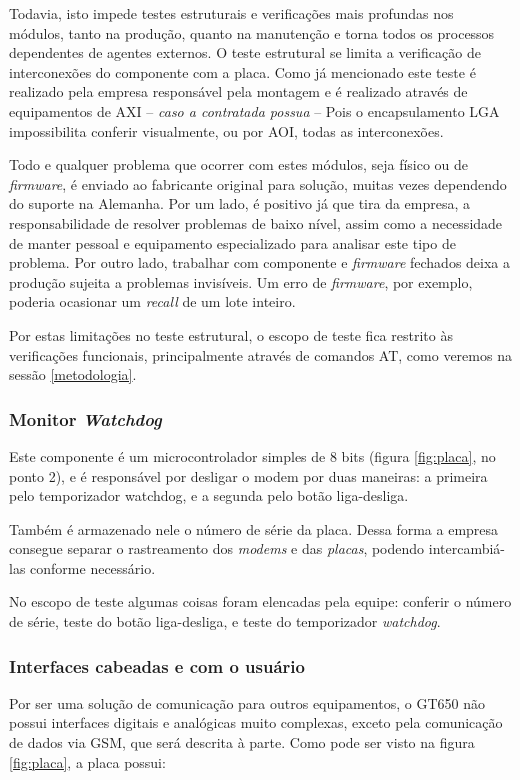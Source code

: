                 Todavia, isto impede testes estruturais e verificações mais profundas nos módulos, tanto na produção, quanto na manutenção e torna todos os processos dependentes de agentes externos. O teste estrutural se limita a verificação de interconexões do componente com a placa. Como já mencionado este teste é realizado pela empresa responsável pela montagem e é realizado através de equipamentos de AXI -- \textit{caso a contratada possua} -- Pois o encapsulamento LGA impossibilita conferir visualmente, ou por AOI, todas as interconexões. 
                
                Todo e qualquer problema que ocorrer com estes módulos, seja físico ou de \textit{firmware}, é enviado ao fabricante original para solução, muitas vezes dependendo do suporte na Alemanha. Por um lado, é positivo já que tira da empresa, a responsabilidade de resolver problemas de baixo nível, assim como a necessidade de manter pessoal e equipamento especializado para analisar este tipo de problema. Por outro lado, trabalhar com componente e \textit{firmware} fechados deixa a produção sujeita a problemas invisíveis. Um erro de \textit{firmware}, por exemplo, poderia ocasionar um \textit{recall} de um lote inteiro.
                
                Por estas limitações no teste estrutural, o escopo de teste fica restrito às verificações funcionais, principalmente através de comandos AT, como veremos na sessão \ref{metodologia}. 
                
            \subsubsection{Monitor \textit{Watchdog}}
                Este componente é um microcontrolador simples de 8 bits (figura \ref{fig:placa}, no ponto 2), e é  responsável por desligar o modem por duas maneiras: a primeira pelo temporizador watchdog, e a segunda pelo botão liga-desliga. 
                
                Também é armazenado nele o número de série da placa. Dessa forma a empresa consegue separar o rastreamento dos \emph{modems} e das \emph{placas}, podendo intercambiá-las conforme necessário.
                
                No escopo de teste algumas coisas foram elencadas pela equipe: conferir o número de série, teste do botão liga-desliga, e teste do temporizador \textit{watchdog}.
                
            \subsubsection{Interfaces cabeadas e com o usuário}
                Por ser uma solução de comunicação para outros equipamentos, o GT650 não possui interfaces digitais e analógicas muito complexas, exceto pela comunicação de dados via GSM, que será descrita à parte. Como pode ser visto na figura \ref{fig:placa}, a placa possui:
                
